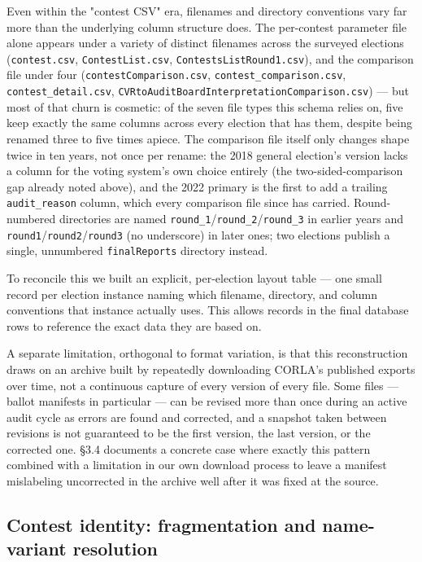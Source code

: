 Even within the "contest CSV" era, filenames and directory conventions
vary far more than the underlying column structure does. The per-contest
parameter file alone appears under a variety of distinct filenames across
the surveyed elections (\texttt{contest.csv}, \texttt{ContestList.csv},
\texttt{ContestsListRound1.csv}), and the comparison file under four
(\texttt{contestComparison.csv}, \texttt{contest\_comparison.csv}, \texttt{contest\_detail.csv},
\texttt{CVRtoAuditBoardInterpretationComparison.csv}) — but most of that churn is
cosmetic: of the seven file types this schema relies on, five keep
exactly the same columns across every election that has them, despite
being renamed three to five times apiece. The comparison file itself only
changes shape twice in ten years, not once per rename: the 2018 general
election's version lacks a column for the voting system's own choice
entirely (the two-sided-comparison gap already noted above), and the 2022
primary is the first to add a trailing \texttt{audit\_reason} column, which every
comparison file since has carried. Round-numbered directories are named
\texttt{round\_1}/\texttt{round\_2}/\texttt{round\_3} in earlier years and \texttt{round1}/\texttt{round2}/\texttt{round3}
(no underscore) in later ones; two elections publish a single, unnumbered
\texttt{finalReports} directory instead.

To reconcile this we built an explicit, per-election layout
table — one small record per election instance naming which filename,
directory, and column conventions that instance actually uses.
This allows records in the final database rows to reference the exact data they are based on.

A separate limitation, orthogonal to format variation, is that this
reconstruction draws on an archive built by repeatedly downloading CORLA's
published exports over time, not a continuous capture of every version of
every file. Some files — ballot manifests in particular — can be revised
more than once during an active audit cycle as errors are found and
corrected, and a snapshot taken between revisions is not guaranteed to be
the first version, the last version, or the corrected one. §3.4 documents
a concrete case where exactly this pattern combined with a limitation in
our own download process to leave a manifest mislabeling uncorrected in
the archive well after it was fixed at the source.

\subsection{Contest identity: fragmentation and name-variant resolution}

